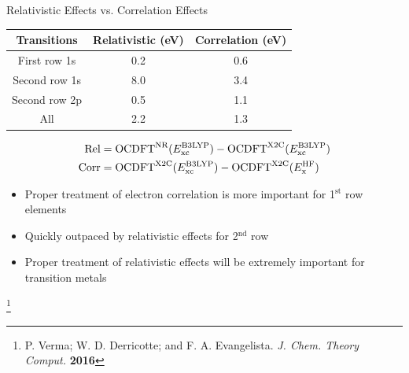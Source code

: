\documentclass[t]{beamer}
\newcommand\blfootnote[1]{%
  \begingroup
  \renewcommand\thefootnote{}\footnote{#1}%
  \addtocounter{footnote}{-1}%
  \endgroup
}
\begin{document}
\begin{frame}{Relativistic Effects vs. Correlation Effects}
\begin{table}[t!]
\begin{tabular}{ccc}
\toprule
Transitions & Relativistic (eV) & Correlation (eV) \\
\midrule
First row 1s & 0.2 & 0.6 \\
Second row 1s & 8.0 & 3.4 \\
Second row 2p & 0.5 & 1.1 \\
All & 2.2 & 1.3 \\
\bottomrule
\end{tabular}
\label{table:CorrRel}
\end{table}
\begin{align}
\text{Rel} &= \text{OCDFT}^{\text{NR}}(E^{\text{B3LYP}}_{\text{xc}}) - \text{OCDFT}^{\text{X2C}}(E^{\text{B3LYP}}_{\rm xc}) \\
\text{Corr} &= \text{OCDFT}^{\text{X2C}}(E^{\text{B3LYP}}_{\text{xc}}) - \text{OCDFT}^{\text{X2C}}(E^{\text{HF}}_{\text{x}})
\end{align}
\begin{itemize}
\item Proper treatment of electron correlation is more important for 1$^{\text{st}}$ row elements
\item Quickly outpaced by relativistic effects for 2$^{\text{nd}}$ row
\item Proper treatment of relativistic effects will be extremely important for transition metals
\end{itemize}
\blfootnote{P. Verma; W. D. Derricotte; and F. A. Evangelista. \textit{J. Chem. Theory Comput.} \textbf{2016}}
\end{frame}
\end{document}
